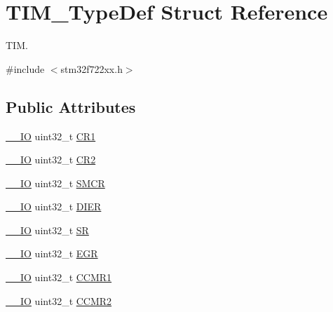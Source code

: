 \hypertarget{struct_t_i_m___type_def}{}\section{T\+I\+M\+\_\+\+Type\+Def Struct Reference}
\label{struct_t_i_m___type_def}


T\+IM.  




{\ttfamily \#include $<$stm32f722xx.\+h$>$}

\subsection*{Public Attributes}
\begin{DoxyCompactItemize}
\item 
\mbox{\hyperlink{core__sc300_8h_aec43007d9998a0a0e01faede4133d6be}{\+\_\+\+\_\+\+IO}} uint32\+\_\+t \mbox{\hyperlink{struct_t_i_m___type_def_a9dafc8b03e8497203a8bb395db865328}{C\+R1}}
\item 
\mbox{\hyperlink{core__sc300_8h_aec43007d9998a0a0e01faede4133d6be}{\+\_\+\+\_\+\+IO}} uint32\+\_\+t \mbox{\hyperlink{struct_t_i_m___type_def_a6b1ae85138ed91686bf63699c61ef835}{C\+R2}}
\item 
\mbox{\hyperlink{core__sc300_8h_aec43007d9998a0a0e01faede4133d6be}{\+\_\+\+\_\+\+IO}} uint32\+\_\+t \mbox{\hyperlink{struct_t_i_m___type_def_a67d30593bcb68b98186ebe5bc8dc34b1}{S\+M\+CR}}
\item 
\mbox{\hyperlink{core__sc300_8h_aec43007d9998a0a0e01faede4133d6be}{\+\_\+\+\_\+\+IO}} uint32\+\_\+t \mbox{\hyperlink{struct_t_i_m___type_def_a22a33c78ca5bec0e3e8559164a82b8ef}{D\+I\+ER}}
\item 
\mbox{\hyperlink{core__sc300_8h_aec43007d9998a0a0e01faede4133d6be}{\+\_\+\+\_\+\+IO}} uint32\+\_\+t \mbox{\hyperlink{struct_t_i_m___type_def_acedfc978c879835c05ef1788ad26b2ff}{SR}}
\item 
\mbox{\hyperlink{core__sc300_8h_aec43007d9998a0a0e01faede4133d6be}{\+\_\+\+\_\+\+IO}} uint32\+\_\+t \mbox{\hyperlink{struct_t_i_m___type_def_a04248d87f48303fd2267810104a7878d}{E\+GR}}
\item 
\mbox{\hyperlink{core__sc300_8h_aec43007d9998a0a0e01faede4133d6be}{\+\_\+\+\_\+\+IO}} uint32\+\_\+t \mbox{\hyperlink{struct_t_i_m___type_def_a0f2291e7efdf3222689ef13e9be2ea4a}{C\+C\+M\+R1}}
\item 
\mbox{\hyperlink{core__sc300_8h_aec43007d9998a0a0e01faede4133d6be}{\+\_\+\+\_\+\+IO}} uint32\+\_\+t \mbox{\hyperlink{struct_t_i_m___type_def_aa8129ca70a2232c91c8cfcaf375249f6}{C\+C\+M\+R2}}

\end{DoxyCompactItemize}
